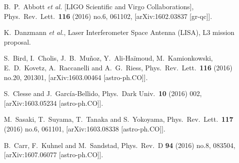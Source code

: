 \providecommand{\href}[2]{#2}\begingroup\raggedright\begin{thebibliography}{10}   

  B.~P.~Abbott {\it et al.} [LIGO Scientific and Virgo Collaborations],
  Phys.\ Rev.\ Lett.\  {\bf 116} (2016) no.6,  061102,
  [arXiv:1602.03837 [gr-qc]].


  K.~Danzmann \textit{et al.}, \href{https://www.elisascience.org/files/publications/LISA_L3_20170120.pdf}{Laser Interferometer Space Antenna (LISA), L3 mission proposal}.

  S.~Bird, I.~Cholis, J.~B.~Muñoz, Y.~Ali-Haïmoud, M.~Kamionkowski, E.~D.~Kovetz, A.~Raccanelli and A.~G.~Riess,
  Phys.\ Rev.\ Lett.\  {\bf 116} (2016) no.20,  201301,
  [arXiv:1603.00464 [astro-ph.CO]].


  S.~Clesse and J.~García-Bellido,
  Phys.\ Dark Univ.\  {\bf 10} (2016) 002,
  [arXiv:1603.05234 [astro-ph.CO]].


  M.~Sasaki, T.~Suyama, T.~Tanaka and S.~Yokoyama,
  Phys.\ Rev.\ Lett.\  {\bf 117} (2016) no.6,  061101,
  [arXiv:1603.08338 [astro-ph.CO]].


  B.~Carr, F.~Kuhnel and M.~Sandstad,
  Phys.\ Rev.\ D {\bf 94} (2016) no.8,  083504,
  [arXiv:1607.06077 [astro-ph.CO]].




\end{thebibliography}
